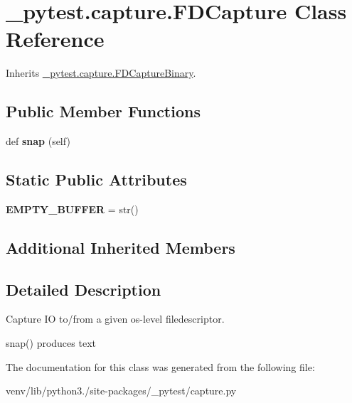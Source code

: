 \hypertarget{class__pytest_1_1capture_1_1_f_d_capture}{}\section{\+\_\+pytest.\+capture.\+F\+D\+Capture Class Reference}
\label{class__pytest_1_1capture_1_1_f_d_capture}


Inherits \hyperlink{class__pytest_1_1capture_1_1_f_d_capture_binary}{\+\_\+pytest.\+capture.\+F\+D\+Capture\+Binary}.

\subsection*{Public Member Functions}
\begin{DoxyCompactItemize}
\item 
\mbox{\label{class__pytest_1_1capture_1_1_f_d_capture_a45348c8d8b9020f2a35447460e001b1f}} 
def {\bfseries snap} (self)
\end{DoxyCompactItemize}
\subsection*{Static Public Attributes}
\begin{DoxyCompactItemize}
\item 
\mbox{\label{class__pytest_1_1capture_1_1_f_d_capture_afa8ae8c743d6a2bab4f64f728a86c9f6}} 
{\bfseries E\+M\+P\+T\+Y\+\_\+\+B\+U\+F\+F\+ER} = str()
\end{DoxyCompactItemize}
\subsection*{Additional Inherited Members}


\subsection{Detailed Description}
\begin{DoxyVerb}Capture IO to/from a given os-level filedescriptor.

snap() produces text
\end{DoxyVerb}
 

The documentation for this class was generated from the following file\+:\begin{DoxyCompactItemize}
\item 
venv/lib/python3./site-\/packages/\+\_\+pytest/capture.\+py\end{DoxyCompactItemize}
